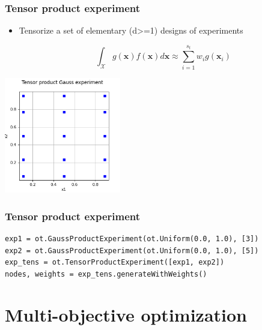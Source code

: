 \documentclass[aspectratio=169]{beamer}
\begin{document}
\begin{frame}[containsverbatim]
\frametitle{Tensor product experiment}

\begin{itemize}
\item Tensorize a set of elementary (d>=1) designs of experiments

$$
\int_{\mathcal{X}} g(\boldsymbol{x}) f(\boldsymbol{x}) d\boldsymbol{x} 
    \approx \sum_{i = 1}^{s_t} w_i g\left(\boldsymbol{x}_i\right)
$$

\end{itemize}


\begin{center}
\includegraphics[width=0.38\textwidth]{figures/TensorProductExperiment.png}
\end{center}
\end{frame}


\begin{frame}[containsverbatim]
\frametitle{Tensor product experiment}


\lstset{language=python}
\begin{lstlisting}
exp1 = ot.GaussProductExperiment(ot.Uniform(0.0, 1.0), [3])
exp2 = ot.GaussProductExperiment(ot.Uniform(0.0, 1.0), [5])
exp_tens = ot.TensorProductExperiment([exp1, exp2])
nodes, weights = exp_tens.generateWithWeights()
\end{lstlisting}

\end{frame}


\section{Multi-objective optimization}
\end{document}

